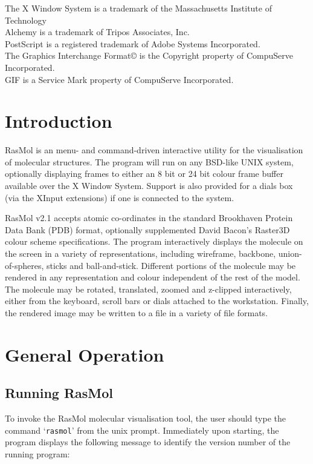 \footnotesize
The X Window System is a trademark of the Massachusetts Institute of 
Technology \\ Alchemy is a trademark of Tripos Associates, Inc. \\
PostScript is a registered trademark of Adobe Systems Incorporated. \\
The Graphics Interchange Format\copyright{} is the Copyright property of
CompuServe Incorporated. \\ 
GIF is a Service Mark property of CompuServe Incorporated.
\normalsize
\newpage

\tableofcontents\clearpage

\section{Introduction}
\label{Introduction}

RasMol is an menu- and command-driven interactive utility for the 
visualisation of molecular structures. The program will run on any BSD-like 
UNIX system, optionally displaying frames to either an 8 bit or 24 bit 
colour frame buffer available over the X Window System. Support is also 
provided for a dials box (via the XInput extensions) if one is connected 
to the system. 

RasMol v2.1 accepts atomic co-ordinates in the standard Brookhaven Protein 
Data Bank (PDB) format, optionally supplemented David Bacon's Raster3D 
colour scheme specifications. The program interactively displays the
molecule on the screen in a variety of representations, including wireframe,
backbone, union-of-spheres, sticks and ball-and-stick. Different portions
of the molecule may be rendered in any representation and colour independent
of the rest of the model. The molecule may be rotated, translated, zoomed
and z-clipped interactively, either from the keyboard, scroll bars or dials
attached to the workstation. Finally, the rendered image may be written to
a file in a variety of file formats.

\section{General Operation}
\label{General}

\subsection{Running RasMol}
\label{Running}
To invoke the RasMol molecular visualisation tool, the user should type
the command `{\tt rasmol}' from the unix prompt. Immediately upon starting,
the program displays the following message to identify the version number
of the running program:

